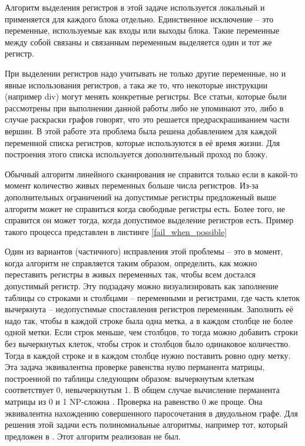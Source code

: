 \documentclass[a4paper,14pt]{extarticle}
\begin{document}
Алгоритм выделения регистров в этой задаче используется локальный и применяется для каждого блока отдельно.
Единственное исключение -- это переменные, используемые как входы или выходы блока.
Такие переменные между собой связаны и связанным переменным выделяется один и тот же регистр.

При выделении регистров надо учитывать не только другие переменные, но и явные использования регистров, а така же то, что некоторые инструкции (например div) могут менять конкретные регистры.
Все статьи, которые были рассмотрены при выполнении данной работы либо не упоминают это, либо в случае раскраски графов говорят, что это решается предраскрашиванием части вершин.
В этой работе эта проблема была решена добавлением для каждой переменной списка регистров, которые используются в её время жизни.
Для построения этого списка используется дополнительный проход по блоку.

Обычный алгоритм линейного сканирования не справится только если в какой-то момент количество живых переменных больше числа регистров.
Из-за дополнительных ограничений на допустимые регистры предложеный выше алгоритм может не справиться когда свободные регистры есть.
Более того, не справится он может тогда, когда допустимое выделение регистров есть.
Пример такого процесса представлен в листинге \ref{fail_when_possible}

Один из вариантов (частичного) исправления этой проблемы -- это в момент, когда алгоритм не справляется таким образом,
определить, как можно переставить регистры в живых переменных так, чтобы всем достался допустимый регистр.
Эту подзадачу можно визуализировать как заполнение таблицы со строками и столбцами -- переменными и регистрами,
где часть клеток вычеркнута -- недопустимые споставления регистров переменным.
Заполнить её надо так, чтобы в каждой строке была одна метка, а в каждом столбце не более одной метки.
Если строк меньше, чем столбцов, то тогда можно добавить строки без вычеркнутых клеток, чтобы строк и столбцов было одинаковое количество.
Тогда в каждой строке и в каждом столбце нужно поставить ровно одну метку.
Эта задача эквивалентна проверке равенства нулю перманента матрицы, построенной по таблицы следующим образом:
вычеркнутым клеткам соответствует 0, невычеркнутым 1.
В общем случае вычисление перманента матрицы из 0 и 1 NP-сложна \cite{valiant_complexity_1979}.
Проверка на равенство 0 же проще.
Она эквивалентна нахождению совершенного паросочетания в двудольном графе.
Для решения этой задачи есть полиномиальные алгоритмы, например тот, который предложен в \cite{chandran_practical_2011}.
Этот алгоритм реализован не был.
\end{document}

